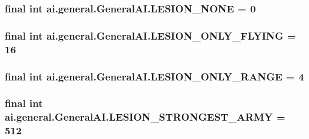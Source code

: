 \label{classai_1_1general_1_1_general_a_i_a1814ecad01f9ca35130005a02aa1d9b3}
\hypertarget{classai_1_1general_1_1_general_a_i_ac7f5bda27c7c53dfa630ac6322c52e0c}{
\subsubsection[{LESION\_\-NONE}]{\setlength{\rightskip}{0pt plus 5cm}final int {\bf ai.general.GeneralAI.LESION\_\-NONE} = 0}}
\label{classai_1_1general_1_1_general_a_i_ac7f5bda27c7c53dfa630ac6322c52e0c}
\hypertarget{classai_1_1general_1_1_general_a_i_a20fd49041df0748fcc4660d213e7251c}{
\subsubsection[{LESION\_\-ONLY\_\-FLYING}]{\setlength{\rightskip}{0pt plus 5cm}final int {\bf ai.general.GeneralAI.LESION\_\-ONLY\_\-FLYING} = 16}}
\label{classai_1_1general_1_1_general_a_i_a20fd49041df0748fcc4660d213e7251c}
\hypertarget{classai_1_1general_1_1_general_a_i_aa0592f035da1ad9ffee68fd94305fb09}{
\subsubsection[{LESION\_\-ONLY\_\-RANGE}]{\setlength{\rightskip}{0pt plus 5cm}final int {\bf ai.general.GeneralAI.LESION\_\-ONLY\_\-RANGE} = 4}}
\label{classai_1_1general_1_1_general_a_i_aa0592f035da1ad9ffee68fd94305fb09}
\hypertarget{classai_1_1general_1_1_general_a_i_a29d5d7f18fa883d00fada4c526a7b659}{
\subsubsection[{LESION\_\-STRONGEST\_\-ARMY}]{\setlength{\rightskip}{0pt plus 5cm}final int {\bf ai.general.GeneralAI.LESION\_\-STRONGEST\_\-ARMY} = 512}}
